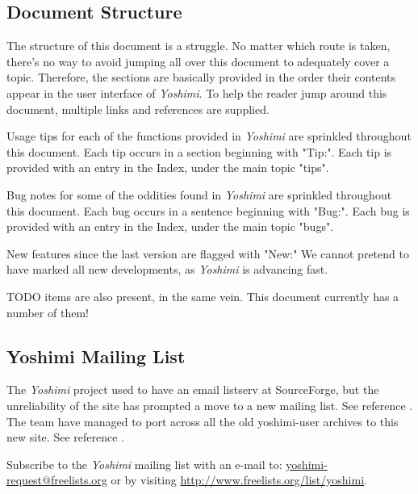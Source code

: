 \documentclass[
 11pt,
 twoside,
 a4paper,
 headinclude,
 footinclude,
 final                                 %
]{article}
\begin{document}
\subsection{Document Structure}
\label{subsec:introduction_document_structure}

   The structure of this document is a struggle.  No matter which route is
   taken, there's no way to avoid jumping all over this document to
   adequately cover a topic.  Therefore, the sections are basically provided
   in the order their contents appear in the user interface of
   \textsl{Yoshimi}.  To help the reader jump around this document, multiple
   links and references are supplied.

   Usage tips
   for each of the functions provided in
   \textsl{Yoshimi} are sprinkled throughout this document.
   Each tip occurs in a section beginning with "Tip:".
   Each tip is provided with an entry in the Index, under the
   main topic "tips".

   Bug notes
   for some of the oddities found in \textsl{Yoshimi} are
   sprinkled throughout this document.
   Each bug occurs in a sentence beginning with "Bug:".
   Each bug is provided with an entry in the Index, under the
   main topic "bugs".

   New features
   since the last version are flagged with "New:"  We cannot pretend to have
   marked all new developments, as \textsl{Yoshimi} is advancing fast.

   TODO items are also present, in the same vein.  This document currently has
   a number of them!

\subsection{Yoshimi Mailing List}
\label{subsec:introduction_mailing_list}

   The \textsl{Yoshimi} project used to have an email listserv at
   SourceForge, but the unreliability of the site has prompted a move to a
   new mailing list.  See reference \cite{yoshiminews}.  The team have
   managed to port across all the old yoshimi-user archives to this new
   site.  See reference \cite{yoshiminewsarchive}.

   Subscribe to the \textsl{Yoshimi} mailing list with an e-mail to:
   \url{yoshimi-request@freelists.org} or by visiting 
   \url{http://www.freelists.org/list/yoshimi}.
\end{document}
